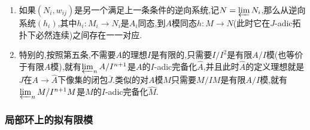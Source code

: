 \begin{enumerate}
\begin{proof}
    	【】
    \end{proof}
    \item 如果$(N_i,w_{ij})$是另一个满足上一条条件的逆向系统,记$N=\varprojlim N_i$,那么从逆向系统$(h_i)$,其中$h_i:M_i\to N_i$是$A_i$同态,到$A$模同态$h:M\to N$(此时它在$J$-adic拓扑下必然连续)之间存在一一对应.
    \item 特别的,按照第五条,不需要$A$的理想$I$是有限的,只需要$I/I^2$是有限$A/I$模(也等价于有限$A$模),就有$\varprojlim_nA/I^{n+1}$是$A$的$I$-adic完备化$\widehat{A}$,并且此时$\widehat{A}$的定义理想就是$J$在$A\to\widehat{A}$下像集的闭包$\overline{J}$.类似的对$A$模$M$只需要$M/IM$是有限$A/I$模,就有$\varprojlim_nM/I^{n+1}M$是$M$的$I$-adic完备化$\widehat{M}$.
\end{enumerate}
\subsubsection{局部环上的拟有限模}

